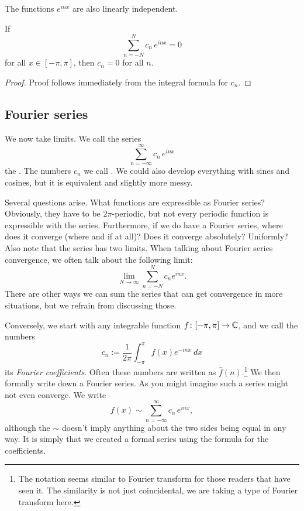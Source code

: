 The functions $e^{inx}$ are also linearly independent.

\begin{prop}
If
\begin{equation*}
\sum_{n=-N}^N c_n \, e^{inx} = 0
\end{equation*}
for all $x \in [-\pi,\pi]$, then $c_n = 0$ for all $n$.
\end{prop}

\begin{proof}
Proof follows immediately from the integral formula for $c_n$.
\end{proof}

\subsection{Fourier series}

We now take limits.  We call the series
\begin{equation*}
\sum_{n=-\infty}^\infty c_n \, e^{inx}
\end{equation*}
the \emph{}.  The numbers $c_n$
we call \emph{}.  We could also develop everything with
sines and cosines, but it is equivalent and slightly more messy.

Several questions arise.  What functions are expressible as 
Fourier series?  Obviously, they have to be $2\pi$-periodic, but not every
periodic function is expressible with the series.  Furthermore, if we do have
a Fourier series, where does it converge (where and if at all)?  Does it converge
absolutely?  Uniformly?  Also note that the series has two
limits.  When talking about Fourier series convergence, we often
talk about the following limit:
\begin{equation*}
\lim_{N\to\infty} 
\sum_{n=-N}^N c_n e^{inx} .
\end{equation*}
There are other ways we can sum the series that can get convergence in more
situations, but we refrain from discussing those.

\medskip

Conversely, we start with any integrable function $f \colon [-\pi,\pi] \to
{\mathbb{C}}$, and we call the numbers
\begin{equation*}
c_n := 
\frac{1}{2\pi} \int_{-\pi}^\pi
f(x) e^{-inx} ~ dx
\end{equation*}
its \emph{Fourier coefficients}.  Often these numbers are
written as $\hat{f}(n)$.\footnote{The notation seems similar
to Fourier transform for those readers that have seen it.
The similarity is not just
coincidental, we are taking a type of Fourier transform here.}
We then formally write down a Fourier series.
As you might imagine such a series might not even converge.
We write
\begin{equation*}
f(x) \sim
\sum_{n=-\infty}^\infty c_n \, e^{inx} ,
\end{equation*}
although the $\sim$ doesn't imply anything about the two sides being equal
in any way.  It is simply that we created a formal series using the formula
for the coefficients.

